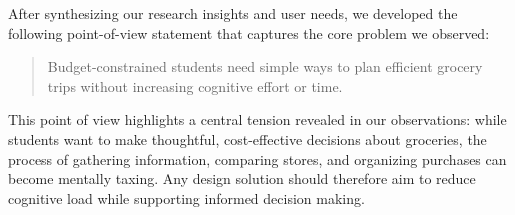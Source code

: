 \documentclass[11pt]{article}
\begin{document}
After synthesizing our research insights and user needs, we developed the following point-of-view statement that captures the core problem we observed:

\begin{quote}
Budget-constrained students need simple ways to plan efficient grocery trips without increasing cognitive effort or time.
\end{quote}

This point of view highlights a central tension revealed in our observations: while students want to make thoughtful, cost-effective decisions about groceries, the process of gathering information, comparing stores, and organizing purchases can become mentally taxing. Any design solution should therefore aim to reduce cognitive load while supporting informed decision making.
\end{document}

